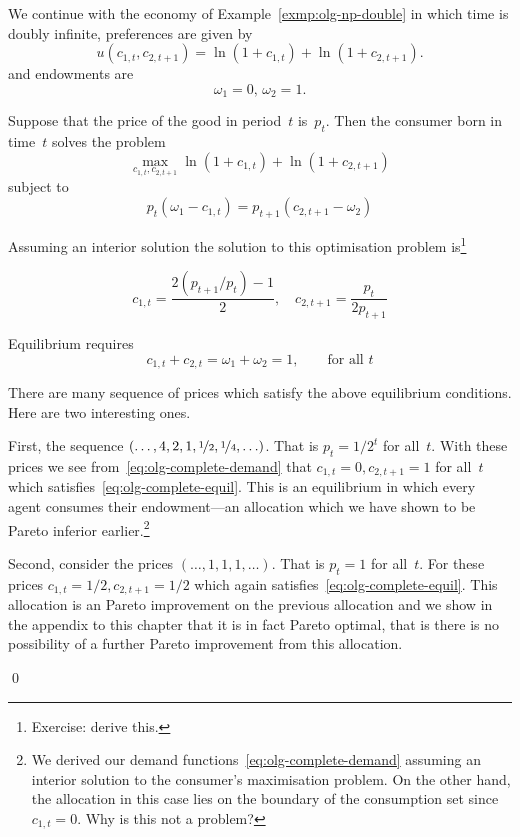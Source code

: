 \documentclass[11pt,reqno,openany]{amsbook}
\begin{document}
\begin{exmp}\label{exmp:olg-complete}
We continue with the economy of Example~\ref{exmp:olg-np-double} in
which time is doubly infinite, preferences are given by
\[u(c_{1,t},c_{2,t+1})=\ln(1+c_{1,t})+\ln(1+c_{2,t+1}).\]
and endowments are
\[\omega_1=0,\, \omega_2=1.\]

Suppose that the price of the good in period~$t$ is~$p_t$. Then the
consumer born in time~$t$ solves the problem
\[\max_{c_{1,t},c_{2,t+1}} \ln(1+c_{1,t})+\ln(1+c_{2,t+1})\]
subject to
\[p_t(\omega_1-c_{1,t})=p_{t+1}(c_{2,t+1}-\omega_2)\]

Assuming an interior solution the solution to this optimisation
problem is\footnote{Exercise: derive this.}

\begin{equation}\label{eq:olg-complete-demand}
c_{1,t}=\frac{2(p_{t+1}/p_t)-1}{2},\quad
c_{2,t+1}=\frac{p_t}{2p_{t+1}}
\end{equation}

Equilibrium requires
\begin{equation}\label{eq:olg-complete-equil}
c_{1,t}+c_{2,t}=\omega_1+\omega_2=1,\qquad \text{for all $t$}
\end{equation}

There are many sequence of prices which satisfy the above equilibrium
conditions. Here are two interesting ones.

First, the sequence $(\ldots,4,2,1,\nicefrac{1}{2},\nicefrac{1}{4},\ldots)$. That is
$p_t=1/2^t$ for all~$t$. With these prices we see
from~\eqref{eq:olg-complete-demand} that $c_{1,t}=0, c_{2,t+1}=1$ for
all~$t$ which satisfies~\eqref{eq:olg-complete-equil}. This is an
equilibrium in which every agent consumes their endowment---an
allocation which we have shown to be Pareto inferior
earlier.\footnote{We derived our demand
  functions~\eqref{eq:olg-complete-demand} assuming an interior
  solution to the consumer's maximisation problem. On the other hand,
  the allocation in this case lies on the boundary of the consumption
  set since $c_{1,t}=0$. Why is this not a problem?}

Second, consider the prices $(\ldots,1,1,1,\ldots)$. That is $p_t=1$
for all~$t$. For these prices $c_{1,t}=1/2, c_{2,t+1}=1/2$ which again
satisfies~\eqref{eq:olg-complete-equil}. This allocation is an Pareto
improvement on the previous allocation and we show in the appendix to
this chapter that it is in fact Pareto optimal, that is there is no
possibility of a further Pareto improvement from this allocation.

\qed
\end{exmp}
\end{document}
